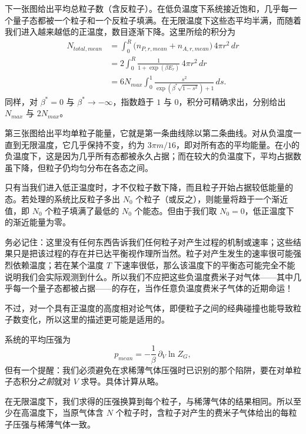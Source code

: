 
下一张图给出平均总粒子数（含反粒子）。在低负温度下系统接近饱和，几乎每一个量子态都被一个粒子和一个反粒子填满。在无限温度下这些态平均半满，而随着我们进入越来越低的正温度，数目逐渐下降。这里所绘的积分为
\begin{align}
N_{total,mean}
&=\int_{0}^{R}\bigl(n_{P,r,mean}+n_{A,r,mean}\bigr)\,4\pi r^{2}\,dr \nonumber\\
&=2\int_{0}^{R}\frac{1}{1+\exp(\beta E_{r})}\,4\pi r^{2}\,dr \nonumber\\
&=6N_{max}\int_{0}^{1}
\frac{s^{2}}{\exp(\beta^{*}\sqrt{1-s^{2}})+1}\,ds .
\end{align}
同样，对 $\beta^{*}=0$ 与 $\beta^{*}\to-\infty$，指数趋于 $1$ 与 $0$，积分可精确求出，分别给出 $N_{max}$ 与 $2N_{max}$。


第三张图给出平均单粒子能量，它就是第一条曲线除以第二条曲线。对从负温度一直到无限温度，它几乎保持不变，约为 $3\pi m/16$，即对所有态的平均能量。在小的负温度下，这是因为几乎所有态都被永久占据；而在较大的负温度下，平均占据数虽下降，但粒子仍均匀分布在各态之间。

只有当我们进入低正温度时，才不仅粒子数下降，而且粒子开始占据较低能量的态。若处理的系统比反粒子多出 $N_{0}$ 个粒子（或反之），则能量将趋于一个渐近值，即 $N_{0}$ 个粒子填满了最低的 $N_{0}$ 个能态。但由于我们取 $N_{0}=0$，低正温度下的渐近能量为零。

务必记住：这里没有任何东西告诉我们任何粒子对产生过程的机制或速率；这些结果只是把该过程的存在并已达平衡视作理所当然。粒子对产生发生的速率很可能强烈依赖温度；若在某个温度 $T$ 下速率很低，那么该温度下的平衡态可能完全不能说明我们会实际观测到什么。所以我们不应把这些负温度费米子对气体——其中几乎每一个量子态都被占据——的存在，当作任意负温度费米子气体的近期命运！


不过，对一个具有正温度的高度相对论气体，即便粒子之间的经典碰撞也能导致粒子数变化，所以这里的描述更可能是适用的。

系统的平均压强为
\begin{equation}
p_{mean}=-\frac{1}{\beta}\,\partial_{V}\ln Z_{G},
\end{equation}
但有一个提醒：我们必须避免在求稀薄气体压强时已识别的那个陷阱，要在对单粒子态积分\emph{之前}就对 $V$ 求导。具体计算从略。

在无限温度下，我们求得的压强换算到每个粒子，与稀薄气体的结果相同。所以至少在高温度下，当原气体含 $N$ 个粒子时，含粒子对产生的费米子气体给出的每粒子压强与稀薄气体一致。

